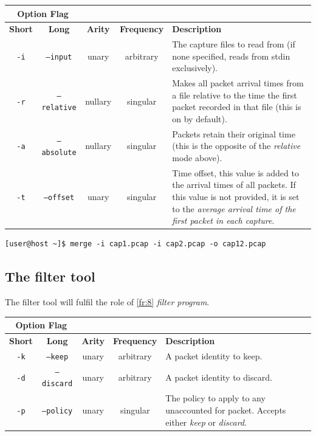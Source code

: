 \documentclass[10pt,a4paper,notitlepage,twoside]{report}
\begin{document}
\begin{tabularx}{\textwidth}{|c|c|c|c|X|}
\cline{1-2}
\multicolumn{2}{|c|}{\textbf{Option Flag}} & \multicolumn{3}{c}{}\\ \hline
\textbf{Short} & \textbf{Long} & \textbf{Arity} & \textbf{Frequency} & \textbf{Description} \\ \hline
\texttt{-i} & \texttt{--input} & unary & arbitrary & The capture files to read from (if none specified, reads from stdin exclusively).\\ \hline
\texttt{-r} & \texttt{--relative} & nullary & singular & Makes all packet arrival times from a file relative to the time the first packet recorded in that file (this is on by default).\\ \hline
\texttt{-a} & \texttt{--absolute} & nullary & singular & Packets retain their original time (this is the opposite of the \emph{relative} mode above).\\ \hline
\texttt{-t} & \texttt{--offset} & unary & singular & Time offset, this value is added to the arrival times of all packets. If this value is not provided, it is set to the \emph{average arrival time of the first packet in each capture}. \\ \hline
\end{tabularx}

\begin{verbatim}
[user@host ~]$ merge -i cap1.pcap -i cap2.pcap -o cap12.pcap
\end{verbatim}
\subsection{The filter tool}
The filter tool will fulfil the role of \ref{fr:8} \emph{filter program}.

\begin{tabularx}{\textwidth}{|c|c|c|c|X|}
\cline{1-2}
\multicolumn{2}{|c|}{\textbf{Option Flag}} & \multicolumn{3}{c}{}\\ \hline
\textbf{Short} & \textbf{Long} & \textbf{Arity} & \textbf{Frequency} & \textbf{Description} \\ \hline
\texttt{-k} & \texttt{--keep} & unary & arbitrary & A packet identity to keep.\\ \hline
\texttt{-d} & \texttt{--discard} & unary & arbitrary & A packet identity to discard.\\ \hline
\texttt{-p} & \texttt{--policy} & unary & singular & The policy to apply to any unaccounted for packet. Accepts either \emph{keep} or \emph{discard}.\\ \hline
\end{tabularx}
\end{document}
